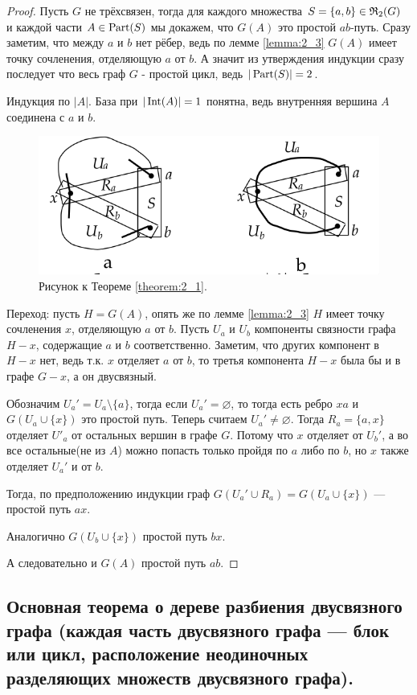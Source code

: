 \begin{proof}
	Пусть $G$ не трёхсвязен, тогда для каждого множества $S = \{a, b \} \in \mathfrak{R}_2(G)$ и каждой части $A \in \operatorname{Part}(S)$ мы докажем, что $G(A)$ это простой $ab$-путь.
	Сразу заметим, что между $a$ и $b$ нет рёбер, ведь по лемме \ref{lemma:2_3} $G(A)$ имеет точку сочленения, отделяющую $a$ от $b$.
	А значит из утверждения индукции сразу последует что весь граф $G$ - простой цикл, ведь $|\operatorname{Part}(S)| = 2$.

	Индукция по $|A|$.
	База при $|\operatorname{Int}(A)| = 1$ понятна, ведь внутренняя вершина $A$ соединена с $a$ и $b$.

\begin{figure}[ht]
    \centering
	\includegraphics[width=0.5\columnwidth]{figures/theorem_2_1.png}
	\caption{Рисунок к Теореме \ref{theorem:2_1}.}
    \label{fig:theorem_2_1}
\end{figure}

	Переход: пусть $H = G(A)$, опять же по лемме \ref{lemma:2_3} $H$ имеет точку сочленения $x$, отделяющую $a$ от $b$.
	Пусть $U_a$ и $U_b$ компоненты связности графа $H - x$, содержащие $a$ и $b$ соответственно.
	Заметим, что других компонент в $H - x$ нет, ведь т.к. $x$ отделяет $a$ от $b$, то третья компонента $H - x$ была бы и в графе $G - x$, а он двусвязный.

	Обозначим $U_a' = U_a \setminus \{a\}$, тогда если $U_a' = \varnothing$, то тогда есть ребро  $xa$ и  $G(U_a \cup \{x\})$ это простой путь.
	Теперь считаем $U_a' \neq \varnothing$.
	Тогда $R_a = \{a, x \}$ отделяет $U'_a$ от остальных вершин в графе $G$.
	Потому что $x$ отделяет от $U_b'$, а во все остальные(не из $A$) можно попасть только пройдя по $a$ либо по $b$, но $x$ также отделяет $U_a'$ и от $b$.

	Тогда, по предположению индукции граф $G(U_a' \cup R_a) = G(U_a \cup \{x\})$ — простой путь $ax$.

	Аналогично $G(U_b \cup \{x\})$ простой путь $bx$.

	А следовательно и $G(A)$ простой путь $ab$.
\end{proof}

\subsection{Основная теорема о дереве разбиения двусвязного графа (каждая часть двусвязного графа — блок или цикл, расположение неодиночных разделяющих множеств двусвязного графа).}

